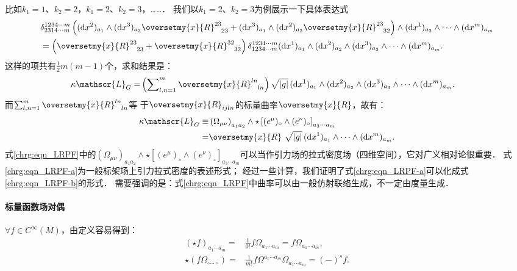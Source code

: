 比如$k_1=1$、$k_2=2$，$k_1=2$、$k_2=3$，……．
我们以$k_1=2$、$k_2=3$为例展示一下具体表达式
\begin{align*}
	&\delta_{2314 \cdots m}^{1234 \cdots m}
	\left(({\rm d}x^{2})_{a_1} \wedge ({\rm d}x^{3})_{a_2} \oversetmy{x}{R}_{\hphantom{23}23}^{23} 
	+({\rm d}x^{3})_{a_1} \wedge ({\rm d}x^{2})_{a_2} \oversetmy{x}{R}_{\hphantom{23}32}^{23}
	\right) \wedge ({\rm d}x^{1})_{a_{3}} \wedge \cdots \wedge ({\rm d}x^{m})_{a_m} \\
	&= \left(\oversetmy{x}{R}_{\hphantom{23}23}^{23} +\oversetmy{x}{R}_{\hphantom{23}32}^{32} \right)
	\delta_{1234 \cdots m}^{1234 \cdots m}
	({\rm d}x^{1})_{a_1} \wedge ({\rm d}x^{2})_{a_2} \wedge 
	({\rm d}x^{3})_{a_{3}} \wedge \cdots \wedge ({\rm d}x^{m})_{a_m}.
\end{align*}
这样的项共有$\frac{1}{2}m(m-1)$个，求和结果是：
\begin{align*}
	\kappa\mathscr{L}_{G} = &  \left( \sum\nolimits_{l,n=1}^{m}
	\oversetmy{x}{R}_{\hphantom{ln}ln}^{ln} \right) \sqrt{|g|}\,
	({\rm d}x^{1})_{a_1} \wedge ({\rm d}x^{2})_{a_2} \wedge 
	({\rm d}x^{3})_{a_{3}} \wedge \cdots \wedge ({\rm d}x^{m})_{a_m}.
\end{align*}	
而$\sum_{l,n=1}^{m}\oversetmy{x}{R}_{\hphantom{ln}ln}^{ln}$等
于$\oversetmy{x}{R}_{ijln}$的标量曲率$\oversetmy{x}{R}$，故有：
\begin{subequations}\label{chrg:eqn_LRPF}
	\begin{align}
		\kappa\mathscr{L}_{G} \equiv &
		\left(\Omega_{\mu\nu}\right)_{a_1 a_2} \wedge \star \left[ (e^\mu)_{\circ} 
		\wedge (e^\nu)_{\circ} \right]_{a_3 \cdots a_m} 	 \label{chrg:eqn_LRPF-a} \\
		=&	\oversetmy{x}{R}\ \sqrt{|g|}\, 
		({\rm d}x^{1})_{a_1}  \wedge \cdots \wedge ({\rm d}x^{m})_{a_m} . 
		\label{chrg:eqn_LRPF-b}
	\end{align}
\end{subequations}
式\eqref{chrg:eqn_LRPF}中的$\left(\Omega_{\mu\nu}\right)_{a_1 a_2} \wedge \star \left[ (e^\mu)_{\circ} 
\wedge (e^\nu)_{\circ} \right]_{a_3 \cdots a_m}$可以当作引力场的拉式密度场（四维空间），它对广义相对论很重要．
式\eqref{chrg:eqn_LRPF-a}为一般标架场上引力拉式密度的表述形式；
经过一些计算，我们证明了式\eqref{chrg:eqn_LRPF-a}可以化成式\eqref{chrg:eqn_LRPF-b}的形式．
需要强调的是：式\eqref{chrg:eqn_LRPF}中曲率可以由一般仿射联络生成，不一定由度量生成．


\paragraph{标量函数场对偶}
$\forall f\in C^\infty(M)$，由定义容易得到：
\begin{align}
	(\star f)_{a_1 \cdots a_m} = & \frac{1}{0!} f \Omega_{a_1 \cdots a_m} 
	= f \Omega_{a_1 \cdots a_m}, \label{chrg:eqn_fHs} \\
	\star (f \Omega_{\circ \cdots \circ}) = & \frac{1}{m!} f \Omega^{a_1 \cdots a_m} \Omega_{a_1 \cdots a_m} 
	= (-)^s f.  \label{chrg:eqn_fOsf}
\end{align}


